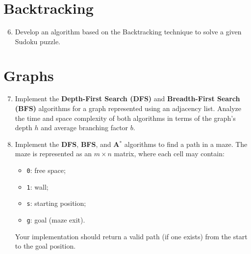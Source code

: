\documentclass{article}
\begin{document}
\section*{Backtracking}

\begin{enumerate}
    \setcounter{enumi}{5}
    \item Develop an algorithm based on the Backtracking technique to solve a given Sudoku puzzle.
\end{enumerate}

\section*{Graphs}

\begin{enumerate}
    \setcounter{enumi}{6}
    \item Implement the \textbf{Depth-First Search (DFS)} and \textbf{Breadth-First Search (BFS)} algorithms for a graph represented using an adjacency list. Analyze the time and space complexity of both algorithms in terms of the graph's depth $h$ and average branching factor $b$.
    
    \item Implement the \textbf{DFS}, \textbf{BFS}, and \textbf{A$^*$} algorithms to find a path in a maze. The maze is represented as an $m \times n$ matrix, where each cell may contain:
    
    \begin{itemize}
        \item \texttt{0}: free space;
        \item \texttt{1}: wall;
        \item \texttt{s}: starting position;
        \item \texttt{g}: goal (maze exit).
    \end{itemize}
    
    Your implementation should return a valid path (if one exists) from the start to the goal position.
\end{enumerate}
\end{document}
